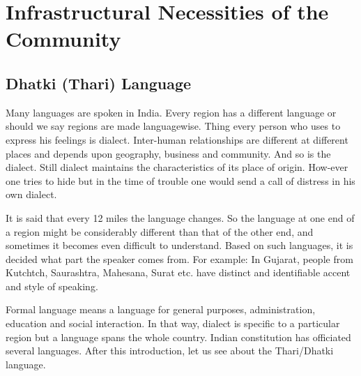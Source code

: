 \chapter{Infrastructural Necessities of the Community}
\section{Dhatki (Thari) Language}
Many languages are spoken in India. Every region has a different language or should we say regions are made languagewise. Thing every person who uses to express his feelings is dialect. Inter-human relationships are different at different places and depends upon geography, business and community. And so is the dialect. Still dialect maintains the characteristics of its place of origin. How-ever one tries to hide but in the time of trouble one would send a call of distress in his own dialect.

It is said that every 12 miles the language changes. So the language at one end of a region might be considerably different than that of the other end, and sometimes it becomes even difficult to understand. Based on such languages, it is decided what part the speaker comes from. For example: In Gujarat, people from Kutchtch, Saurashtra, Mahesana, Surat etc. have distinct and identifiable accent and style of speaking.

Formal language means a language for general purposes, administration, education and social interaction. In that way, dialect is specific to a particular region but a language spans the whole country. Indian constitution has officiated several languages. After this introduction, let us see about the Thari/Dhatki language.


